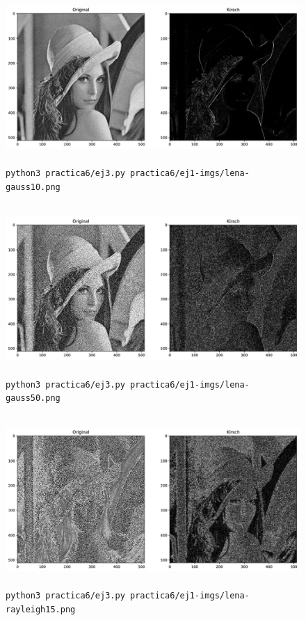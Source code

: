 \documentclass[11pt, spanish]{article}
\begin{document}
\begin{figure}[H]
\centering
    \includegraphics[height=6.5cm]{informe-imgs/ej3--lena-gauss10.jpg}
    \caption{\texttt{python3 practica6/ej3.py practica6/ej1-imgs/lena-gauss10.png }}
\end{figure}

\begin{figure}[H]
\centering
    \includegraphics[height=6.5cm]{informe-imgs/ej3--lena-gauss50.jpg}
    \caption{\texttt{python3 practica6/ej3.py practica6/ej1-imgs/lena-gauss50.png }}
\end{figure}

\begin{figure}[H]
\centering
    \includegraphics[height=6.5cm]{informe-imgs/ej3--lena-rayleigh15.jpg}
    \caption{\texttt{python3 practica6/ej3.py practica6/ej1-imgs/lena-rayleigh15.png }}
\end{figure}
\end{document}
